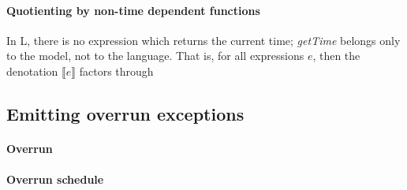 \documentclass[preprint]{sigplanconf}
\theoremstyle{definition}
\newcommand{\interp}[1]{\llbracket{#1}\rrbracket}
\begin{document}
\paragraph{Quotienting by non-time dependent functions}

In L, there is no expression which returns the current time; 
 \emph{getTime} belongs only to the model, not to the language.
That is, for all expressions $e$, then the denotation 
$\interp{e}$ factors through 


\subsection{Emitting overrun exceptions}

\paragraph{Overrun}

\paragraph{Overrun schedule}
\end{document}
